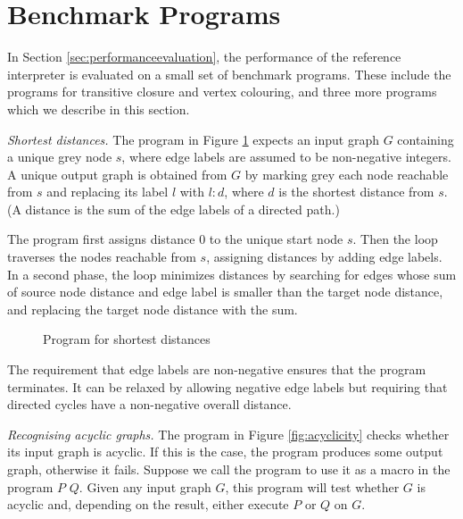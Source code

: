 \section{Benchmark Programs}
\label{sec:benchmark}
 
In Section \ref{sec:performanceevaluation}, the performance of the reference interpreter is evaluated on a small set of benchmark programs. These include the programs for transitive closure and vertex colouring, and three more programs which we describe in this section.

\vspace{.5\baselineskip}
\noindent
\emph{Shortest distances.} The program in Figure \ref{fig:shortest-distances} expects an input graph $G$\/ containing a unique grey node $s$, where edge labels are assumed to be non-negative integers. A unique output graph is obtained from $G$ by marking grey each node reachable from $s$ and replacing its label $l$\/ with $l{:}d$, where $d$\/ is the shortest distance from $s$. (A distance is the sum of the edge labels of a directed path.)
  
The program first assigns distance 0 to the unique start node $s$. Then the loop  traverses the nodes reachable from $s$, assigning distances by adding edge labels. In a second phase, the loop  minimizes distances by searching for edges whose sum of source node distance and edge label is smaller than the target node distance, and replacing the target node distance with the sum.

\begin{figure}[htb]
\begin{center}

\end{center}
\caption{Program for shortest distances}\label{fig:shortest-distances}
\end{figure}

The requirement that edge labels are non-negative ensures that the program terminates. It can be relaxed by allowing negative edge labels but requiring that directed cycles have a non-negative overall distance.

\vspace{.5\baselineskip}
\noindent
\emph{Recognising acyclic graphs.} The program in Figure \ref{fig:acyclicity} checks whether its input graph is acyclic. If this is the case, the program produces some output graph, otherwise it fails. Suppose we call the program  to use it as a macro in the program    $P$  $Q$. Given any input graph $G$, this program will test whether $G$\/ is acyclic and, depending on the result, either execute $P$ or $Q$ on $G$.  
  
